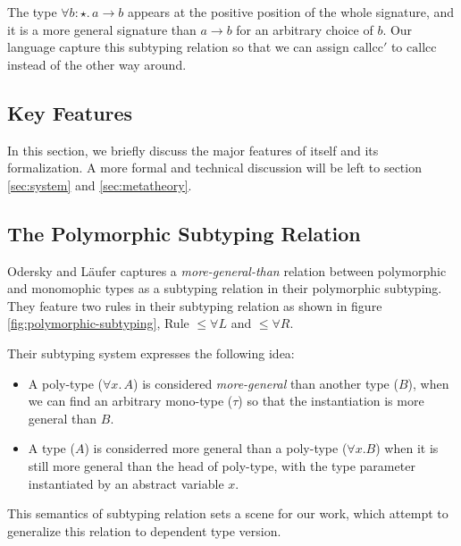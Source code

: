 The type $\forall b : \star.\, a \rightarrow b$ appears at the positive position
of the whole signature, and it is a more general signature than $a \rightarrow b$
for an arbitrary choice of $b$. Our language capture this subtyping relation so that
 we can assign $\mathrm{callcc}'$ to $\mathrm{callcc}$ instead of the other way around.

\subsection{Key Features}

In this section, we briefly discuss the major features of \name itself and
its formalization. A more formal and technical discussion will be left to
section \ref{sec:system} and \ref{sec:metatheory}.

\subsection{The Polymorphic Subtyping Relation}
Odersky and L\"aufer captures a \emph{more-general-than} relation between
polymorphic and monomophic types as a subtyping relation in their polymorphic
subtyping\cite{odersky1996putting}. They feature two rules in their
subtyping relation as shown in figure \ref{fig:polymorphic-subtyping},
Rule $\le\forall L$ and $\le\forall R$.

Their subtyping system expresses the following idea:

\begin{itemize}
  \item A poly-type ($\forall x.\, A$) is considered \emph{more-general}
        than another type ($B$), when we can find an arbitrary mono-type ($\tau$)
        so that the instantiation is more general than $B$.
  \item A type ($A$) is considerred more general than a poly-type ($\forall x. B$)
        when it is still more general than the head of poly-type, with the type
        parameter instantiated by an abstract variable $x$.
\end{itemize}

This semantics of subtyping relation sets a scene for our work, which attempt
to generalize this relation to dependent type version.

